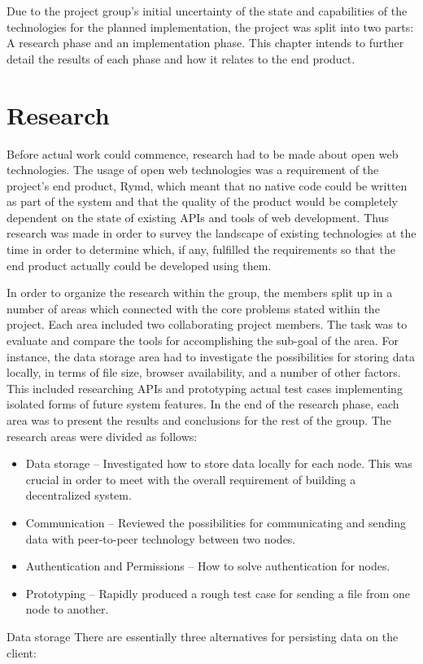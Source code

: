 Due to the project group's initial uncertainty of the state and capabilities of the technologies for the planned implementation, the project was split into two parts: A research phase and an implementation phase. This chapter intends to further detail the results of each phase and how it relates to the end product.

\section{Research}

Before actual work could commence, research had to be made about open web technologies. The usage of open web technologies was a requirement of the project's end product, Rymd, which meant that no native code could be written as part of the system and that the quality of the product would be completely dependent on the state of existing APIs and tools of web development. Thus research was made in order to survey the landscape of existing technologies at the time in order to determine which, if any, fulfilled the requirements so that the end product actually could be developed using them.

In order to organize the research within the group, the members split up in a number of areas which connected with the core problems stated within the project. Each area included two collaborating project members. The task was to evaluate and compare the tools for accomplishing the sub-goal of the area. For instance, the data storage area had to investigate the possibilities for storing data locally, in terms of file size, browser availability, and a number of other factors. This included researching APIs and prototyping actual test cases implementing isolated forms of future system features. In the end of the research phase, each area was to present the results and conclusions for the rest of the group. The research areas were divided as follows:

\begin{itemize}
\item Data storage – Investigated how to store data locally for each node. This was crucial in order to meet with the overall requirement of building a decentralized system. 
\item Communication – Reviewed the possibilities for communicating and sending data with peer-to-peer technology between two nodes.
\item Authentication and Permissions – How to solve authentication for nodes.
  \item Prototyping – Rapidly produced a rough test case for sending a file from one node to another.
\end{itemize}
Data storage
There are essentially three alternatives for persisting data on the client: 

